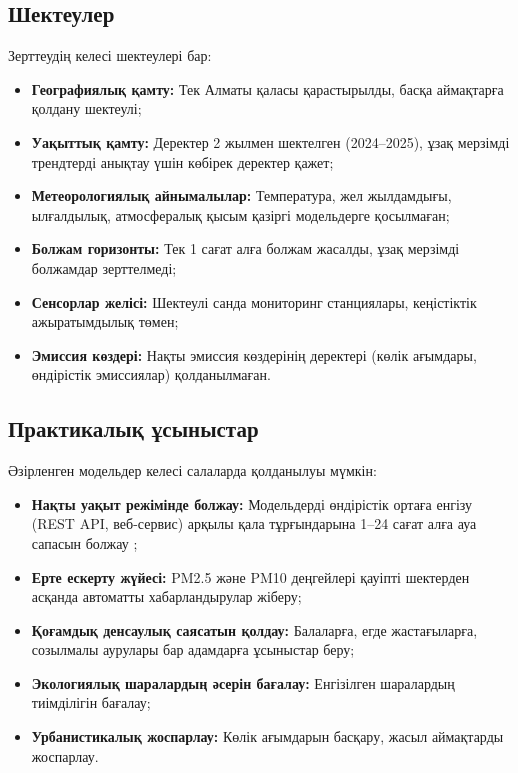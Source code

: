 \documentclass[12pt,a4paper]{article}
\begin{document}
\subsection{Шектеулер}

Зерттеудің келесі шектеулері бар:
\begin{itemize}
\item \textbf{Географиялық қамту:} Тек Алматы қаласы қарастырылды, басқа аймақтарға қолдану шектеулі;
\item \textbf{Уақыттық қамту:} Деректер 2 жылмен шектелген (2024–2025), ұзақ мерзімді трендтерді анықтау үшін көбірек деректер қажет;
\item \textbf{Метеорологиялық айнымалылар:} Температура, жел жылдамдығы, ылғалдылық, атмосфералық қысым қазіргі модельдерге қосылмаған;
\item \textbf{Болжам горизонты:} Тек 1 сағат алға болжам жасалды, ұзақ мерзімді болжамдар зерттелмеді;
\item \textbf{Сенсорлар желісі:} Шектеулі санда мониторинг станциялары, кеңістіктік ажыратымдылық төмен;
\item \textbf{Эмиссия көздері:} Нақты эмиссия көздерінің деректері (көлік ағымдары, өндірістік эмиссиялар) қолданылмаған.
\end{itemize}

\subsection{Практикалық ұсыныстар}

Әзірленген модельдер келесі салаларда қолданылуы мүмкін:
\begin{itemize}
\item \textbf{Нақты уақыт режімінде болжау:} Модельдерді өндірістік ортаға енгізу (REST API, веб-сервис) арқылы қала тұрғындарына 1–24 сағат алға ауа сапасын болжау \cite{zheng2013};
\item \textbf{Ерте ескерту жүйесі:} PM2.5 және PM10 деңгейлері қауіпті шектерден асқанда автоматты хабарландырулар жіберу;
\item \textbf{Қоғамдық денсаулық саясатын қолдау:} Балаларға, егде жастағыларға, созылмалы аурулары бар адамдарға ұсыныстар беру;
\item \textbf{Экологиялық шаралардың әсерін бағалау:} Енгізілген шаралардың тиімділігін бағалау;
\item \textbf{Урбанистикалық жоспарлау:} Көлік ағымдарын басқару, жасыл аймақтарды жоспарлау.
\end{itemize}
\end{document}
